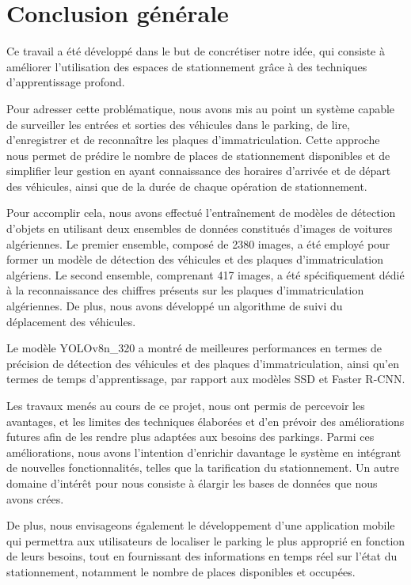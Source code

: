\chapter*{Conclusion générale}
\thispagestyle{plain}
Ce travail a été développé dans le but de concrétiser notre idée, qui consiste à améliorer l'utilisation des espaces de stationnement grâce à des techniques d'apprentissage profond.

Pour adresser cette problématique, nous avons mis au point un système capable de surveiller les entrées et sorties des véhicules dans le parking, de lire, d'enregistrer et de reconnaître les plaques d'immatriculation. Cette approche nous permet de prédire le nombre de places de stationnement disponibles et de simplifier leur gestion en ayant connaissance des horaires d'arrivée et de départ des véhicules, ainsi que de la durée de chaque opération de stationnement.


Pour accomplir cela, nous avons effectué l'entraînement de modèles de détection d'objets en utilisant deux ensembles de données constitués d'images de voitures algériennes. Le premier ensemble, composé de 2380 images, a été employé pour former un modèle de détection des véhicules et des plaques d'immatriculation algériens. Le second ensemble, comprenant 417 images, a été spécifiquement dédié à la reconnaissance des chiffres présents sur les plaques d'immatriculation algériennes. De plus, nous avons développé un algorithme de suivi du déplacement des véhicules.

Le modèle YOLOv8n\_320 a montré de meilleures performances en termes de précision de détection des véhicules et des plaques d'immatriculation, ainsi qu'en termes de temps d'apprentissage, par rapport aux modèles SSD et Faster R-CNN.

Les travaux menés au cours de ce projet, nous ont permis de percevoir les avantages, et les
limites des techniques élaborées et d'en prévoir des améliorations futures afin de les rendre plus adaptées aux besoins des parkings. Parmi ces améliorations, nous avons l'intention d'enrichir davantage le système en intégrant de nouvelles fonctionnalités, telles que la tarification du stationnement. Un autre domaine d'intérêt pour nous consiste à élargir les bases de données que nous avons crées.

De plus, nous envisageons également le développement d'une application mobile qui permettra aux utilisateurs de localiser le parking le plus approprié en fonction de leurs besoins, tout en fournissant des informations en temps réel sur l'état du stationnement, notamment le nombre de places disponibles et occupées.

